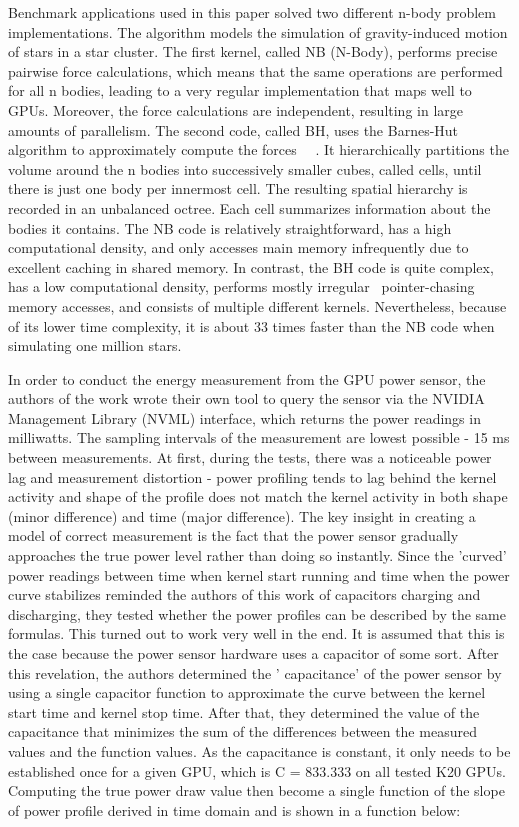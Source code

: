 Benchmark applications used in this paper solved two different
n-body problem implementations. The algorithm models the simulation
of gravity-induced motion of stars in a star cluster. The first
kernel, called NB (N-Body), performs precise pairwise force
calculations, which means that the same operations are performed
for all n bodies, leading to a very regular implementation that
maps well to GPUs. Moreover, the force calculations are
independent, resulting in large amounts of parallelism. The second
code, called BH, uses the Barnes-Hut algorithm to approximately
compute the forces~\cite{O(N)_Force_Calculation_Algorithm}
~\cite{LonestarGPU}. It hierarchically partitions the
volume around the n bodies into successively smaller cubes, called
cells, until there is just one body per innermost cell. The
resulting spatial hierarchy is recorded in an unbalanced octree.
Each cell summarizes information about the bodies it contains. The
NB code is relatively straightforward, has a high computational
density, and only accesses main memory infrequently due to
excellent caching in shared memory. In contrast, the BH code is
quite complex, has a low computational density, performs mostly
irregular~\cite{Irregular_Programs_GPUs_Study} pointer-chasing
memory accesses, and consists of multiple different kernels.
Nevertheless, because of its lower time complexity, it is about
33 times faster than the NB code when simulating one million stars.

In order to conduct the energy measurement from the GPU power
sensor, the authors of the work wrote their own tool to query the
sensor via the NVIDIA Management Library (NVML) interface, which
returns the power readings in milliwatts. The sampling intervals
of the measurement are lowest possible - 15 ms between
measurements. At first, during the tests, there was a noticeable
power lag and measurement distortion - power profiling tends to
lag behind the kernel activity and shape of the profile does not
match the kernel activity in both shape (minor difference) and time
(major difference). The key insight in creating a model of correct
measurement is the fact that the power sensor gradually approaches
the true power level rather than doing so instantly. Since the
'curved' power readings between time when kernel start running and
time when the power curve stabilizes reminded the authors of this
work of capacitors charging and discharging, they tested whether
the power profiles can be described by the same formulas. This
turned out to work very well in the end. It is assumed that this
is the case because the power sensor hardware uses a capacitor of
some sort. After this revelation, the authors determined the '
capacitance' of the power sensor by using a single capacitor
function to approximate the curve between the kernel start time
and kernel stop time. After that, they determined the value of the
capacitance that minimizes the sum of the differences between the
measured values and the function values. As the capacitance is
constant, it only needs to be established once for a given GPU,
which is C = 833.333 on all tested K20 GPUs. Computing the true
power draw value then become a single function of the slope of
power profile derived in time domain and is shown in a function
below:

